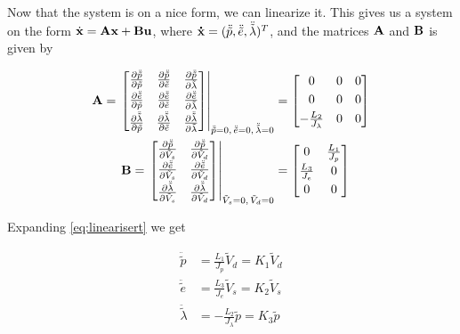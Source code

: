Now that the system is on a nice form, we can linearize it. This gives us a system on the form $ \dot{\mathbf{x}} = \mathbf{A} \mathbf{x} + \mathbf{B} \mathbf{u} $, where $\mathbf{\dot x} = (\ddot{\tilde p}, \ddot{\tilde e}, \ddot{\tilde \lambda})^T$, and the matrices $\mathbf{A}$ and $\mathbf{B}$ is given by
	
\begin{subequations}
	\begin{align}
		\mathbf{A} =\left. \begin{bmatrix}
			\frac{\partial{\ddot{\tilde{p}}}}{\partial{\tilde p}} & \frac{\partial{\ddot{\tilde p}}}{\partial{\tilde e}} & \frac{\partial{\ddot{\tilde p}}}{\partial{\tilde \lambda}}\\[0.3em]
			\frac{\partial{\ddot{\tilde{e}}}}{\partial{\tilde p}} & \frac{\partial{\ddot{\tilde{e}}}}{\partial{\tilde e}} & \frac{\partial{\ddot{\tilde{e}}}}{\partial{\tilde \lambda}}\\[0.3em]
			\frac{\partial{\ddot{\tilde \lambda}}}{\partial{\tilde p}} & \frac{\partial{\ddot{\tilde \lambda}}}{\partial{\tilde e}} & \frac{\partial{\ddot{\tilde \lambda}}}{\partial{\tilde \lambda}}
		\end{bmatrix} \right|_{\ddot{\tilde p} = 0 ,\, \ddot{\tilde e} = 0,\, \ddot{\tilde \lambda} = 0 } &= 
		\begin{bmatrix}
			0 & 0 & 0\\[0.3em]
			0 & 0 & 0\\[0.3em]
			-\frac{L_2}{J_\lambda} & 0 & 0
		\end{bmatrix}\\
		\mathbf{B} = \left. \begin{bmatrix}
			\frac{\partial{\ddot{\tilde p}}}{\partial{\tilde V_s}} & \frac{\partial{\ddot{\tilde p}}}{\partial{\tilde V_d}}\\[0.3em]
			\frac{\partial{\ddot{\tilde e}}}{\partial{\tilde V_s}} & \frac{\partial{\ddot{\tilde e}}}{\partial{\tilde V_d}}\\[0.3em]
			\frac{\partial{\ddot{\tilde \lambda}}}{\partial{\tilde V_s}} & \frac{\partial{\ddot{\tilde \lambda}}}{\partial{\tilde V_d}}
		\end{bmatrix} \right|_{\tilde V_s = 0,\, \tilde V_d = 0} &= 
		\begin{bmatrix}
			0 & \frac{L_1}{J_p}\\[0.3em]
			\frac{L_3}{J_e} & 0\\[0.3em]
			0 & 0
		\end{bmatrix}
	\end{align}
	\label{eq:linearisert}
\end{subequations}

Expanding \cref{eq:linearisert} we get

\begin{subequations}
	\begin{align}
		\ddot{\tilde p} &= \frac{L_1}{J_p} \tilde V_d = K_1 \tilde V_d\\
		\ddot{\tilde e} &= \frac{L_3}{J_e} \tilde V_s = K_2 \tilde V_s\\
		\ddot{\tilde \lambda} &= -\frac{L_2}{J_{\lambda}} \tilde p = K_3 \tilde p
	\end{align}
\end{subequations}

